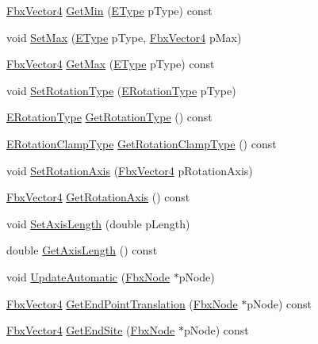 \begin{DoxyCompactItemize}
\item 
\hyperlink{class_fbx_vector4}{Fbx\+Vector4} \hyperlink{class_fbx_limits_utilities_a17c96a6c202377bf7bea876d9c8a630b}{Get\+Min} (\hyperlink{class_fbx_limits_utilities_aa55167751039b3d64b56cb7e58f2e62c}{E\+Type} p\+Type) const
\item 
void \hyperlink{class_fbx_limits_utilities_ace31ad7ad7492a26aa4a0d9bc64c369b}{Set\+Max} (\hyperlink{class_fbx_limits_utilities_aa55167751039b3d64b56cb7e58f2e62c}{E\+Type} p\+Type, \hyperlink{class_fbx_vector4}{Fbx\+Vector4} p\+Max)
\item 
\hyperlink{class_fbx_vector4}{Fbx\+Vector4} \hyperlink{class_fbx_limits_utilities_aa99f9ea9f9b1174d3971b63bc6a6e016}{Get\+Max} (\hyperlink{class_fbx_limits_utilities_aa55167751039b3d64b56cb7e58f2e62c}{E\+Type} p\+Type) const
\item 
void \hyperlink{class_fbx_limits_utilities_ab756ed1a7da36f3fe871c866a5727265}{Set\+Rotation\+Type} (\hyperlink{class_fbx_limits_utilities_a8c1ec432e195d91eae2548fbc98c8770}{E\+Rotation\+Type} p\+Type)
\item 
\hyperlink{class_fbx_limits_utilities_a8c1ec432e195d91eae2548fbc98c8770}{E\+Rotation\+Type} \hyperlink{class_fbx_limits_utilities_a8e3e2905e30827006ce2f0d205649479}{Get\+Rotation\+Type} () const
\item 
\hyperlink{class_fbx_limits_utilities_a6724e1b0b6ba776ecb0c66e7b0ed075d}{E\+Rotation\+Clamp\+Type} \hyperlink{class_fbx_limits_utilities_a665cefafe64f564fc4f5841f84bac8f4}{Get\+Rotation\+Clamp\+Type} () const
\item 
void \hyperlink{class_fbx_limits_utilities_a851515616b12ed28516c40767dcc96cb}{Set\+Rotation\+Axis} (\hyperlink{class_fbx_vector4}{Fbx\+Vector4} p\+Rotation\+Axis)
\item 
\hyperlink{class_fbx_vector4}{Fbx\+Vector4} \hyperlink{class_fbx_limits_utilities_accbb4c66f1e0769ce4893814d4415372}{Get\+Rotation\+Axis} () const
\item 
void \hyperlink{class_fbx_limits_utilities_a0823e9206b2adba552e54811dfe11378}{Set\+Axis\+Length} (double p\+Length)
\item 
double \hyperlink{class_fbx_limits_utilities_afa51661729568ef9c39b84c79b6b6ef0}{Get\+Axis\+Length} () const
\item 
void \hyperlink{class_fbx_limits_utilities_a7f562d759a98f601f8bbb23727506c39}{Update\+Automatic} (\hyperlink{class_fbx_node}{Fbx\+Node} $\ast$p\+Node)
\item 
\hyperlink{class_fbx_vector4}{Fbx\+Vector4} \hyperlink{class_fbx_limits_utilities_a89a48af2f22f1996c447460bbe7e80fa}{Get\+End\+Point\+Translation} (\hyperlink{class_fbx_node}{Fbx\+Node} $\ast$p\+Node) const
\item 
\hyperlink{class_fbx_vector4}{Fbx\+Vector4} \hyperlink{class_fbx_limits_utilities_a0ec23f52b10360f82fd1670f984697dd}{Get\+End\+Site} (\hyperlink{class_fbx_node}{Fbx\+Node} $\ast$p\+Node) const
\end{DoxyCompactItemize}


